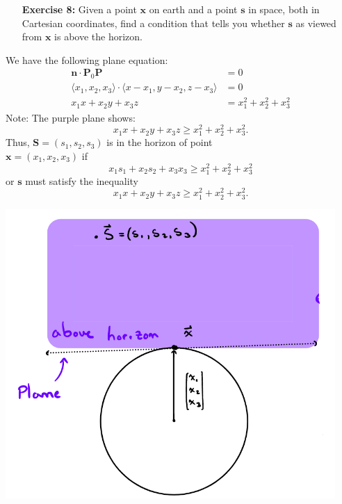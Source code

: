 \documentclass[11pt]{article}
\theoremstyle{definition}
\newcommand{\1}[1]{\mathbf{1} \left \{ #1 \right \}}
\begin{document}
\begin{itemize}
\item[{\textbf{Exercise 8:}}] Given a point $\textbf{x}$ on earth and a point $\textbf{s}$ in space, both in Cartesian coordinates, find a condition that tells you whether $\textbf{s}$ as viewed from $\textbf{x}$ is above the horizon.
\end{itemize}
\begin{minipage}{0.6\linewidth}
We have the following plane equation:
\begin{align*}
    \textbf{n} \cdot \textbf{P}_0\textbf{P} &= 0 \\
    \langle x_1, x_2, x_3 \rangle \cdot \langle x-x_1, y-x_2, z-x_3 \rangle &= 0 \\
    x_1x + x_2y + x_3z &= x_1^2 + x_2^2 + x_3^2
\end{align*}
Note: The purple plane shows:
\[x_1x + x_2y + x_3z \geq x_1^2 + x_2^2 + x_3^2.\]
Thus, $\textbf{S} = (s_1, s_2, s_3)$ is in the horizon of point \\
$\textbf{x} = (x_1, x_2, x_3)$ if
\[x_1s_1 + x_2s_2 + x_3x_3 \geq x_1^2 + x_2^2 + x_3^2\]
or $\textbf{s}$ must satisfy the inequality
\[x_1x + x_2y + x_3z \geq x_1^2 + x_2^2 + x_3^2.\]
\end{minipage}
\begin{minipage}{0.4\linewidth}
\includegraphics[width=0.3\textheight]{Images/M5600_6.PNG}
\end{minipage}
\end{document}
